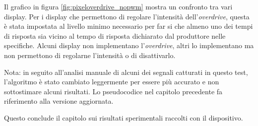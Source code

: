 Il grafico in figura \ref{fig:pixeloverdrive_nopwm} mostra un confronto tra vari display. Per i display che permettono di regolare l'intensità dell'\textit{overdrive}, questa è stata impostata al livello minimo necessario per far si che almeno uno dei tempi di risposta sia vicino al tempo di risposta dichiarato dal produttore nelle specifiche. Alcuni display non implementano l'\textit{overdrive}, altri lo implementano ma non permettono di regolarne l'intensità o di disattivarlo.

Nota: in seguito all'analisi manuale di alcuni dei segnali catturati in questo test, l'algoritmo è stato cambiato leggermente per essere più accurato e non sottostimare alcuni risultati. Lo pseudocodice nel capitolo precedente fa riferimento alla versione aggiornata.

Questo conclude il capitolo sui risultati sperimentali raccolti con il dispositivo.
